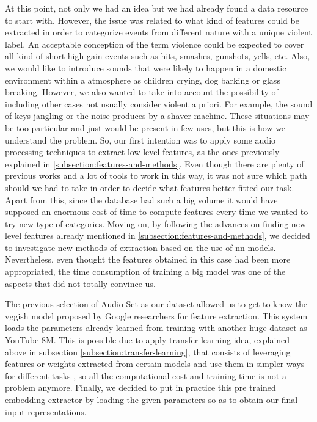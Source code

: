 	At this point, not only we had an idea but we had already found a data resource to start with. However, the issue was related to what kind of features could be extracted in order to categorize events from different nature with a unique violent label. An acceptable conception of the term violence could be expected to cover all kind of short high gain events such as hits, smashes, gunshots, yells, etc. Also, we would like to introduce sounds that were likely to happen in a domestic environment within a  atmosphere as children crying, dog barking or glass breaking. However, we also wanted to take into account the possibility of including other cases not usually consider violent a priori. For example, the sound of keys jangling or the noise produces by a shaver machine. These situations may be too particular and just would be present in few uses, but this is how we understand the problem. So, our first intention was to apply some audio processing techniques to extract low-level features, as the ones previously explained in \ref{subsection:features-and-methods}. Even though there are plenty of previous works and a lot of tools to work in this way, it was not sure which path should we had to take in order to decide what features better fitted our task. Apart from this, since the database had such a big volume it would have supposed an enormous cost of time to compute features every time we wanted to try new type of categories. Moving on, by following the advances on finding new level features already mentioned in \ref{subsection:features-and-methods}, we decided to investigate new methods of extraction based on the use of \acrlong{nn} models. Nevertheless, even thought the features obtained in this case had been more appropriated, the time consumption of training a big model was one of the aspects that did not totally convince us.
	
	The previous selection of Audio Set as our dataset allowed us to get to know the \acrshort{vgg}ish model proposed by Google researchers for feature extraction. This system loads the parameters already learned from training with another huge dataset as YouTube-8M. This is possible due to apply transfer learning idea, explained above in subsection \ref{subsection:transfer-learning}, that consists of leveraging features or weights extracted from certain models and use them in simpler ways for different tasks \cite{Sarkar2018}, so all the computational cost and training time is not a problem anymore. Finally, we decided to put in practice this pre trained embedding extractor by loading the given parameters so as to obtain our final input representations.
	
